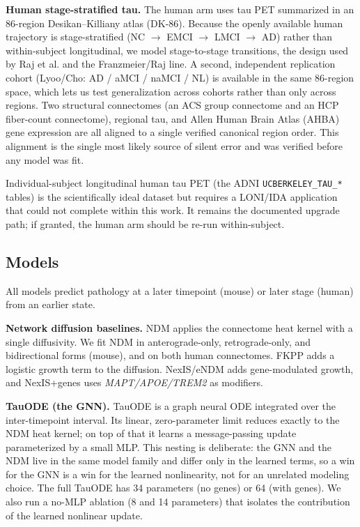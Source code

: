 \documentclass{article}
\begin{document}
\textbf{Human stage-stratified tau.} The human arm uses tau PET summarized in an 86-region Desikan--Killiany atlas (DK-86). Because the openly available human trajectory is stage-stratified (NC $\rightarrow$ EMCI $\rightarrow$ LMCI $\rightarrow$ AD) rather than within-subject longitudinal, we model stage-to-stage transitions, the design used by Raj et al. \cite{raj2015} and the Franzmeier/Raj line. A second, independent replication cohort (Lyoo/Cho: AD / aMCI / naMCI / NL) is available in the same 86-region space, which lets us test generalization across cohorts rather than only across regions. Two structural connectomes (an ACS group connectome and an HCP fiber-count connectome), regional tau, and Allen Human Brain Atlas (AHBA) gene expression \cite{hawrylycz2012} are all aligned to a single verified canonical region order. This alignment is the single most likely source of silent error and was verified before any model was fit.

Individual-subject longitudinal human tau PET (the ADNI \texttt{UCBERKELEY\_TAU\_*} tables) is the scientifically ideal dataset but requires a LONI/IDA application that could not complete within this work. It remains the documented upgrade path; if granted, the human arm should be re-run within-subject.

\subsection{Models}

All models predict pathology at a later timepoint (mouse) or later stage (human) from an earlier state.

\textbf{Network diffusion baselines.} NDM applies the connectome heat kernel with a single diffusivity. We fit NDM in anterograde-only, retrograde-only, and bidirectional forms (mouse), and on both human connectomes. FKPP adds a logistic growth term to the diffusion. NexIS/eNDM adds gene-modulated growth, and NexIS+genes uses \textit{MAPT/APOE/TREM2} as modifiers.

\textbf{TauODE (the GNN).} TauODE is a graph neural ODE integrated over the inter-timepoint interval. Its linear, zero-parameter limit reduces exactly to the NDM heat kernel; on top of that it learns a message-passing update parameterized by a small MLP. This nesting is deliberate: the GNN and the NDM live in the same model family and differ only in the learned terms, so a win for the GNN is a win for the learned nonlinearity, not for an unrelated modeling choice. The full TauODE has 34 parameters (no genes) or 64 (with genes). We also run a no-MLP ablation (8 and 14 parameters) that isolates the contribution of the learned nonlinear update.
\end{document}
